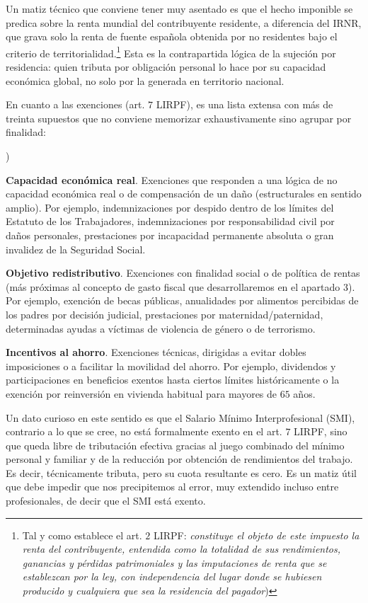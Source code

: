 \documentclass[10pt,a4paper]{article}
\newcounter{alphaitem}
\newenvironment{la}
      {\begin{list}{\alph{alphaitem})}{%
          \usecounter{alphaitem}%
          \setlength{\leftmargin}{1cm}%
          \setlength{\parskip}{3pt}%
          \setlength{\itemsep}{0pt}%
          \setlength{\parsep}{0pt}%
      }}
      {\end{list}}
\begin{document}
Un matiz técnico que conviene tener muy asentado es que el hecho imponible se predica sobre la renta mundial del contribuyente residente, a diferencia del IRNR, que grava solo la renta de fuente española obtenida por no residentes bajo el criterio de territorialidad.\footnote{%
    Tal y como establece el art. $2$ LIRPF: \textit{constituye el objeto de este impuesto la renta del contribuyente, entendida como la totalidad de sus rendimientos, ganancias y pérdidas patrimoniales y las imputaciones de renta que se establezcan por la ley, con independencia del lugar donde se hubiesen producido y cualquiera que sea la residencia del pagador})
} Esta es la contrapartida lógica de la sujeción por residencia: quien tributa por obligación personal lo hace por su capacidad económica global, no solo por la generada en territorio nacional.

En cuanto a las exenciones (art. $7$ LIRPF), es una lista extensa con más de treinta supuestos que no conviene memorizar exhaustivamente sino agrupar por finalidad:
\begin{la}
    \item \textbf{Capacidad económica real}. Exenciones que responden a una lógica de no capacidad económica real o de compensación de un daño (estructurales en sentido amplio). Por ejemplo, indemnizaciones por despido dentro de los límites del Estatuto de los Trabajadores, indemnizaciones por responsabilidad civil por daños personales, prestaciones por incapacidad permanente absoluta o gran invalidez de la Seguridad Social.
    \item \textbf{Objetivo redistributivo}. Exenciones con finalidad social o de política de rentas (más próximas al concepto de gasto fiscal que desarrollaremos en el apartado 3). Por ejemplo, exención de becas públicas, anualidades por alimentos percibidas de los padres por decisión judicial, prestaciones por maternidad/paternidad, determinadas ayudas a víctimas de violencia de género o de terrorismo.
    \item \textbf{Incentivos al ahorro}. Exenciones técnicas, dirigidas a evitar dobles imposiciones o a facilitar la movilidad del ahorro. Por ejemplo, dividendos y participaciones en beneficios exentos hasta ciertos límites históricamente o la exención por reinversión en vivienda habitual para mayores de $65$ años.
\end{la}

Un dato curioso en este sentido es que el Salario Mínimo Interprofesional (SMI), contrario a lo que se cree, no está formalmente exento en el art. $7$ LIRPF, sino que queda libre de tributación efectiva gracias al juego combinado del mínimo personal y familiar y de la reducción por obtención de rendimientos del trabajo. Es decir, técnicamente tributa, pero su cuota resultante es cero. Es un matiz útil que debe impedir que nos precipitemos al error, muy extendido incluso entre profesionales, de decir que el SMI está exento.
\end{document}
